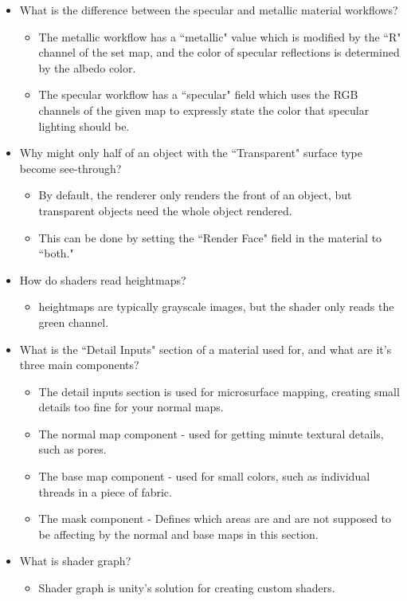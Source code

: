 \documentclass{article}
\begin{document}
\begin{itemize}
    \item What is the difference between the specular and metallic material workflows?
    \begin{itemize}
        \item The metallic workflow has a ``metallic" value which is modified by the ``R" channel of the set map, and the color of specular reflections is determined by the albedo color.
        \item The specular workflow has a ``specular" field which uses the RGB channels of the given map to expressly state the color that specular lighting should be.
    \end{itemize}
    \item Why might only half of an object with the ``Transparent" surface type become see-through?
    \begin{itemize}
        \item By default, the renderer only renders the front of an object, but transparent objects need the whole object rendered.
        \item This can be done by setting the ``Render Face" field in the material to ``both."
    \end{itemize}
    \item How do shaders read heightmaps?
    \begin{itemize}
        \item heightmaps are typically grayscale images, but the shader only reads the green channel.
    \end{itemize}
    \item What is the ``Detail Inputs" section of a material used for, and what are it's three main components?
    \begin{itemize}
        \item The detail inputs section is used for microsurface mapping, creating small details too fine for your normal maps.
        \item The normal map component - used for getting minute textural details, such as pores.
        \item The base map component - used for small colors, such as individual threads in a piece of fabric.
        \item The mask component - Defines which areas are and are not supposed to be affecting by the normal and base maps in this section.
    \end{itemize}
    \item What is shader graph?
    \begin{itemize}
        \item Shader graph is unity's solution for creating custom shaders.
    \end{itemize}
\end{itemize}
\end{document}

